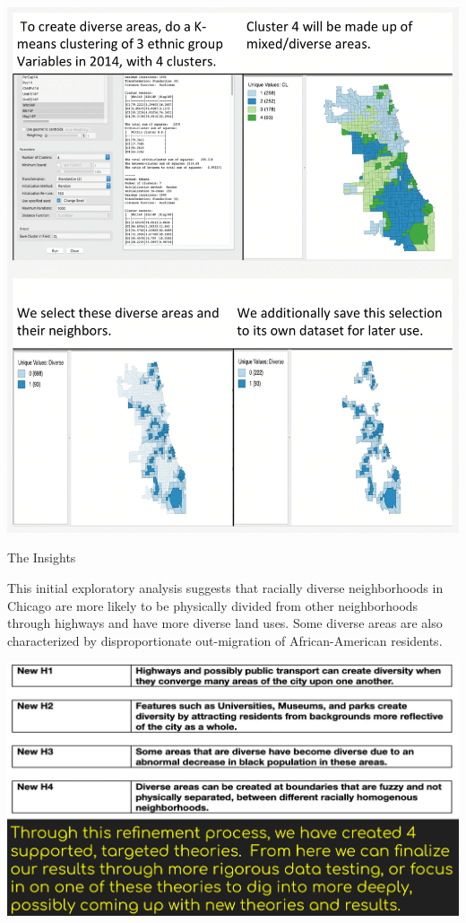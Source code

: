 \documentclass[
]{book}
\begin{document}
\includegraphics{images/racialdiversity4.png}

The Insights

This initial exploratory analysis suggests that racially diverse neighborhoods in Chicago are more likely to be physically divided from other neighborhoods through highways and have more diverse land uses. Some diverse areas are also characterized by disproportionate out-migration of African-American residents.

\includegraphics{images/racialdiversity5.png}
\end{document}
